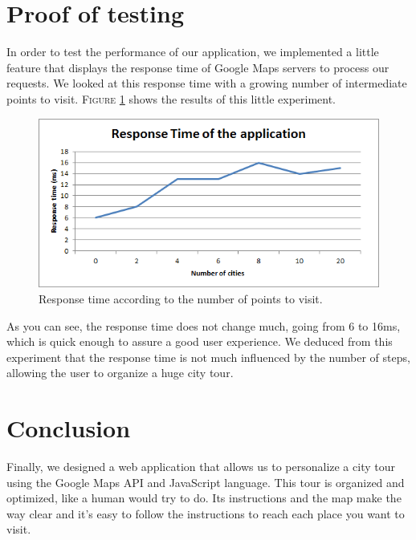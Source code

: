 \section{Proof of testing}

In order to test the performance of our application, we implemented a little feature that displays the response time of Google Maps servers to process our requests. We looked at this response time with a growing number of intermediate points to visit. \textsc{Figure} \ref{fig:response} shows the results of this little experiment.
\begin{figure}[h!]
	\centering
	\includegraphics[scale=0.7]{input/response.png}
	\caption{Response time according to the number of points to visit.}
	\label{fig:response}
\end{figure}

\newpage As you can see, the response time does not change much, going from 6 to 16ms, which is quick enough to assure a good user experience.
We deduced from this experiment that the response time is not much influenced by the number of steps, allowing the user to organize a huge city tour.

\section{Conclusion}
			Finally, we designed a web application that allows us to personalize a city tour using the Google Maps API and JavaScript language. This tour is organized and optimized, like a human would try to do. Its instructions and the map make the way clear and it's easy to follow the instructions to reach each place you want to visit.